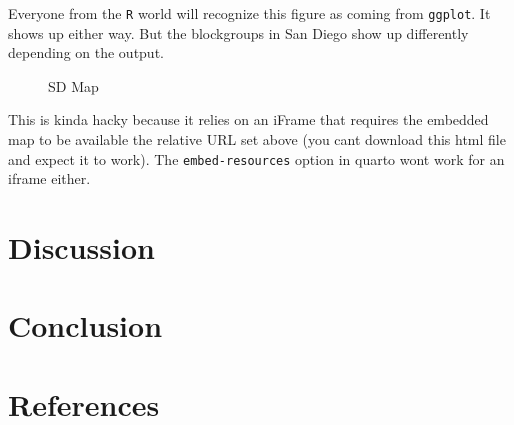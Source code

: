 \documentclass[
  letterpaper,
  DIV=11,
  numbers=noendperiod]{scrartcl}
\begin{document}
Everyone from the \texttt{R} world will recognize this figure as coming
from \texttt{ggplot}. It shows up either way. But the blockgroups in San
Diego show up differently depending on the output.

\begin{figure}


\caption{\label{fig-sdmap}SD Map}

\end{figure}%

\begin{tcolorbox}[enhanced jigsaw, colframe=quarto-callout-note-color-frame, breakable, leftrule=.75mm, arc=.35mm, opacityback=0, titlerule=0mm, colback=white, bottomrule=.15mm, toprule=.15mm, opacitybacktitle=0.6, bottomtitle=1mm, coltitle=black, toptitle=1mm, colbacktitle=quarto-callout-note-color!10!white, title=\textcolor{quarto-callout-note-color}{\faInfo}\hspace{0.5em}{Note}, rightrule=.15mm, left=2mm]

This is kinda hacky because it relies on an iFrame that requires the
embedded map to be available the relative URL set above (you cant
download this html file and expect it to work). The
\texttt{embed-resources} option in quarto wont work for an iframe
either.

\end{tcolorbox}

\section{Discussion}\label{discussion}

\section{Conclusion}\label{conclusion}

\section{References}\label{references}
\end{document}
